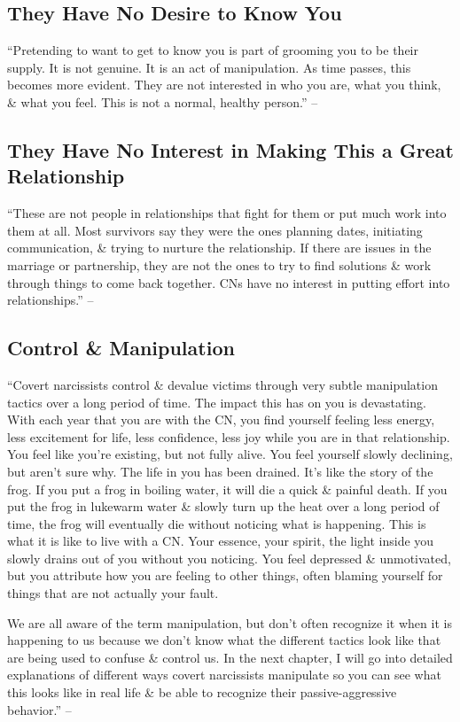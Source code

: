\documentclass{article}
\numberwithin{equation}{section}
\begin{document}
\subsection{They Have No Desire to Know You}
``Pretending to want to get to know you is part of grooming you to be their supply. It is not genuine. It is an act of manipulation. As time passes, this becomes more evident. They are not interested in who you are, what you think, \& what you feel. This is not a normal, healthy person.'' -- \cite[p. 71]{Mirza2017}

\subsection{They Have No Interest in Making This a Great Relationship}
``These are not people in relationships that fight for them or put much work into them at all. Most survivors say they were the ones planning dates, initiating communication, \& trying to nurture the relationship. If there are issues in the marriage or partnership, they are not the ones to try to find solutions \& work through things to come back together. CNs have no interest in putting effort into relationships.'' -- \cite[pp. 71--72]{Mirza2017}

\subsection{Control \& Manipulation}
``Covert narcissists control \& devalue victims through very subtle manipulation tactics over a long period of time. The impact this has on you is devastating. With each year that you are with the CN, you find yourself feeling less energy, less excitement for life, less confidence, less joy while you are in that relationship. You feel like you're existing, but not fully alive. You feel yourself slowly declining, but aren't sure why. The life in you has been drained. It's like the story of the frog. If you put a frog in boiling water, it will die a quick \& painful death. If you put the frog in lukewarm water \& slowly turn up the heat over a long period of time, the frog will eventually die without noticing what is happening. This is what it is like to live with a CN. Your essence, your spirit, the light inside you slowly drains out of you without you noticing. You feel depressed \& unmotivated, but you attribute how you are feeling to other things, often blaming yourself for things that are not actually your fault.

We are all aware of the term manipulation, but don't often recognize it when it is happening to us because we don't know what the different tactics look like that are being used to confuse \& control us. In the next chapter, I will go into detailed explanations of different ways covert narcissists manipulate so you can see what this looks like in real life \& be able to recognize their passive-aggressive behavior.'' -- \cite[p. 72]{Mirza2017}
\end{document}
